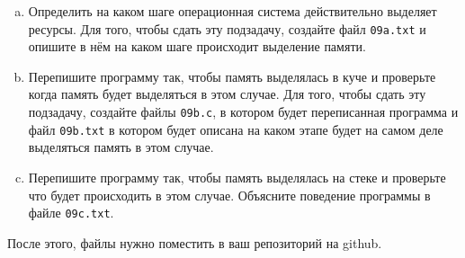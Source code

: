 \documentclass[10pt]{article}
\begin{document}
\begin{enumerate}[a.]
\item Определить на каком шаге операционная система действительно выделяет ресурсы. Для того, чтобы сдать эту подзадачу, создайте файл \texttt{09a.txt} и опишите в нём на каком шаге происходит выделение памяти.
\item Перепишите программу так, чтобы память выделялась в куче и проверьте когда память будет выделяться в этом случае. Для того, чтобы сдать эту подзадачу, создайте файлы \texttt{09b.c}, в котором будет переписанная программа и файл \texttt{09b.txt} в котором будет описана на каком этапе будет на самом деле выделяться память в этом случае.
\item Перепишите программу так, чтобы память выделялась на стеке и проверьте что будет происходить в этом случае. Объясните поведение программы в файле \texttt{09c.txt}.
\end{enumerate}
После этого, файлы нужно поместить в ваш репозиторий на github.
\end{document}
